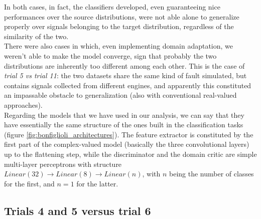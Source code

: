 \documentclass[../main.tex]{subfiles}
\begin{document}
In both cases, in fact, the classifiers developed, even guaranteeing nice performances over the source distributions, were not able alone to generalize properly over signals belonging to the target distribution, regardless of the similarity of the two.\\
There were also cases in which, even implementing domain adaptation, we weren't able to make the model converge, sign that probably the two distributions are inherently too different among each other. This is the case of \textit{trial 5 vs trial 11}: the two datasets share the same kind of fault simulated, but contains signals collected from different engines, and apparently this constituted an impassable obstacle to generalization (also with conventional real-valued approaches).\\
Regarding the models that we have used in our analysis, we can say that they have essentially the same structure of the ones built in the classification tasks (figure \ref{fig:bonfiglioli_architectures}). The feature extractor is constituted by the first part of the complex-valued model (basically the three convolutional layers) up to the flattening step, while the discriminator and the domain critic are simple multi-layer perceptrons with structure $Linear(32)\to Linear(8)\to Linear(n)$, with $n$ being the number of classes for the first, and $n=1$ for the latter.
 
\subsection*{Trials 4 and 5 versus trial 6}
\end{document}
